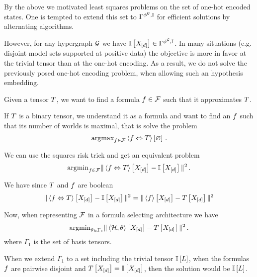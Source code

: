
By the above we motivated least squares problems on the set of one-hot encoded states.
One is tempted to extend this set to $\Gamma^{\phi^{\mathcal{G}},\mathbb{I}}$ for efficient solutions by alternating algorithms.

However, for any hypergraph $\mathcal{G}$ we have $\mathbb{I}\left[X_{[d]}\right]\in\Gamma^{\phi^{\mathcal{G}},\mathbb{I}}$.
In many situations (e.g. disjoint model sets supported at positive data) the objective is more in favor at the trivial tensor than at the one-hot encoding.
As a result, we do not solve the previously posed one-hot encoding problem, when allowing such an hypothesis embedding.


\begin{example}\label{exa:formulaFitting}
	Given a tensor $T$, we want to find a formula $f\in\mathcal{F}$ such that it approximates $T$.

	If $T$ is a binary tensor, we understand it as a formula and want to find an $f$ such that its number of worlds is maximal, that is solve the problem
		\[ \mathrm{argmax}_{f\in\mathcal{F}}\left\langle f\Leftrightarrow T\right\rangle \left[ \varnothing \right]  \, . \]

	We can use the squares risk trick and get an equivalent problem
		\[ \mathrm{argmin}_{f\in\mathcal{F}} \|\left\langle f\Leftrightarrow T\right\rangle \left[ X_{[d]} \right]  - \mathbb{I}\left[X_{[d]}\right] \|^2 \, . \]

	We have since $T$ and $f$ are boolean
	\begin{align*}
		\|\left\langle f\Leftrightarrow T\right\rangle \left[ X_{[d]} \right]  - \mathbb{I}\left[X_{[d]}\right] \|^2
		= 	\|\left\langle f\right\rangle \left[ X_{[d]} \right]  - T\left[X_{[d]}\right] \|^2
	\end{align*}

	Now, when representing $\mathcal{F}$ in a formula selecting architecture we have
		\[ \mathrm{argmin}_{\theta\in\Gamma_1} \|\left\langle \mathcal{H},\theta\right\rangle \left[ X_{[d]} \right]  - T\left[X_{[d]}\right]\|^2 \, . \]
	where $\Gamma_1$ is the set of basis tensors.

	When we extend $\Gamma_1$ to a set including the trivial tensor $\mathbb{I}\left[L\right]$, when the formulas $f$ are pairwise disjoint and $T\left[X_{[d]}\right]=\mathbb{I}\left[X_{[d]}\right]$, then the solution would be $\mathbb{I}\left[L\right]$.

\end{example}

